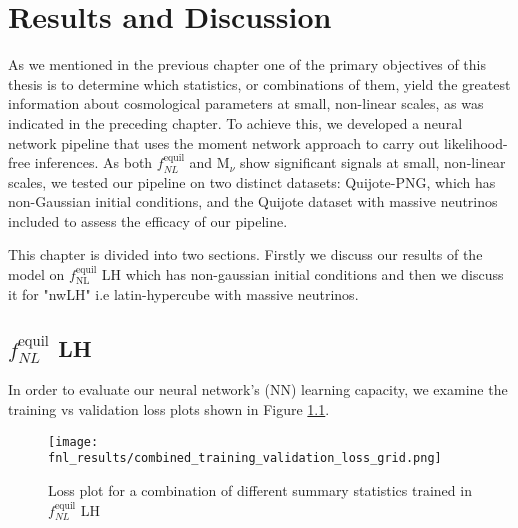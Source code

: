 \chapter{Results and Discussion}\label{result}
\justifying
As we mentioned in the previous chapter one of the primary objectives of this thesis is to determine which statistics, or combinations of them, yield the greatest information about cosmological parameters at small, non-linear scales, as was indicated in the preceding chapter. 
To achieve this, we developed a neural network pipeline that uses the moment network approach to carry out likelihood-free inferences. As both $f_{NL}^{\mathrm{equil}}$ and $\mathrm{M}_{\nu}$ show significant signals at small, non-linear scales, we tested our pipeline on two distinct datasets: Quijote-PNG, which has non-Gaussian initial conditions, and the Quijote dataset with massive neutrinos included to assess the efficacy of our pipeline.

This chapter is divided into two sections. Firstly we discuss our results of the model on $f_{\mathrm{NL}}^\mathrm{equil}$ LH which has non-gaussian initial conditions and then we discuss it for "nwLH" i.e latin-hypercube with massive neutrinos.

\section{\texorpdfstring{$f_{NL}^{\mathrm{equil}}$ LH}{fNL^equil LH}}


In order to evaluate our neural network's (NN) learning capacity, we examine the training vs validation loss plots shown in Figure \ref{fig:fnl_loss_plot}.
\begin{figure}[htbp]
    \centering
    \texttt{[image: fnl\_results/combined\_training\_validation\_loss\_grid.png]}
    \caption{Loss plot for a combination of different summary statistics trained in $f_{NL}^\mathrm{equil}$ LH }
    \label{fig:fnl_loss_plot}
\end{figure}

